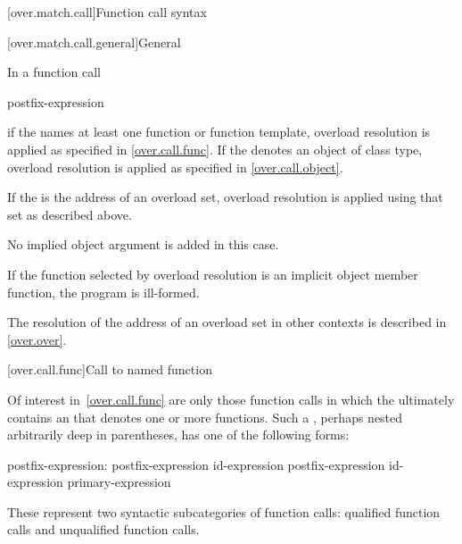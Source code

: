 [over.match.call]{Function call syntax}%

[over.match.call.general]{General}%

\pnum
In a function call
\begin{ncsimplebnf}
postfix-expression \terminal{(}  \terminal{)}
\end{ncsimplebnf}
if the  names at least one function or
function template,
overload resolution is applied as specified in \ref{over.call.func}.
If the  denotes an object of class type, overload
resolution is applied as specified in \ref{over.call.object}.

\pnum
If the  is the address of an overload set,
overload resolution is applied using that set as described above.
\begin{note}
No implied object argument is added in this case.
\end{note}
If the function selected by overload resolution is
an implicit object member function,
the program is ill-formed.
\begin{note}
The resolution of the address of an
overload set in other contexts is described in \ref{over.over}.
\end{note}

[over.call.func]{Call to named function}

\pnum
Of interest in~\ref{over.call.func} are only those function calls in
which the 
ultimately contains an  that
denotes one or more functions.
Such a
,
perhaps nested arbitrarily deep in
parentheses, has one of the following forms:

\begin{ncbnf}
postfix-expression:\br
    postfix-expression  id-expression\br
    postfix-expression \terminal{->} id-expression\br
    primary-expression
\end{ncbnf}

These represent two syntactic subcategories of function calls:
qualified function calls and unqualified function calls.

